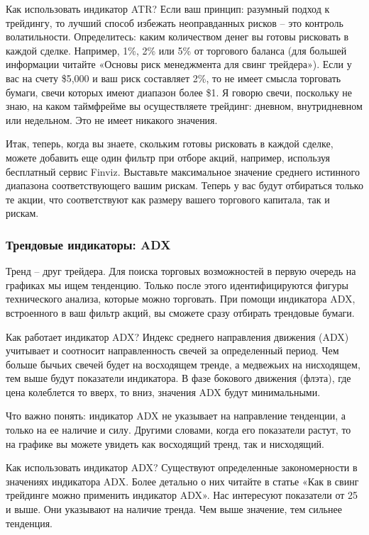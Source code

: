 \documentclass[a5paper]{article}
\begin{document}
Как использовать индикатор ATR? Если ваш принцип: разумный подход к трейдингу, то лучший способ избежать неоправданных рисков – это контроль волатильности. Определитесь: каким количеством денег вы готовы рисковать в каждой сделке. Например, 1\%, 2\% или 5\% от торгового баланса (для большей информации читайте «Основы риск менеджмента для свинг трейдера»). Если у вас на счету \$5,000 и ваш риск составляет 2\%, то не имеет смысла торговать бумаги, свечи которых имеют диапазон более \$1. Я говорю свечи, поскольку не знаю, на каком таймфрейме вы осуществляете трейдинг: дневном, внутридневном или недельном. Это не имеет никакого значения.

Итак, теперь, когда вы знаете, скольким готовы рисковать в каждой
сделке, можете добавить еще один фильтр при отборе акций, например,
используя бесплатный сервис Finviz. Выставьте максимальное значение
среднего истинного диапазона соответствующего вашим рискам. Теперь у
вас будут отбираться только те акции, что соответствуют как размеру
вашего торгового капитала, так и рискам.

\subsubsection{Трендовые индикаторы: ADX}

Тренд – друг трейдера. Для поиска торговых возможностей в первую очередь на графиках мы ищем тенденцию. Только после этого идентифицируются фигуры технического анализа, которые можно торговать. При помощи индикатора ADX, встроенного в ваш фильтр акций, вы сможете сразу отбирать  трендовые бумаги.

Как работает индикатор ADX? Индекс среднего направления движения (ADX) учитывает и соотносит направленность свечей за определенный период. Чем больше бычьих свечей будет на восходящем тренде, а медвежьих на нисходящем, тем выше будут показатели индикатора. В фазе бокового движения (флэта), где цена колеблется то вверх, то вниз, значения ADX будут минимальными.

Что важно понять: индикатор ADX не указывает на направление тенденции, а только на ее наличие и силу. Другими словами, когда его показатели растут, то на графике вы можете увидеть как восходящий тренд, так и нисходящий.

Как использовать индикатор ADX? Существуют определенные закономерности
в значениях индикатора ADX. Более детально о них читайте в статье «Как
в свинг трейдинге можно применить индикатор ADX». Нас интересуют
показатели от 25 и выше. Они указывают на наличие тренда. Чем выше
значение, тем сильнее тенденция.
\end{document}
